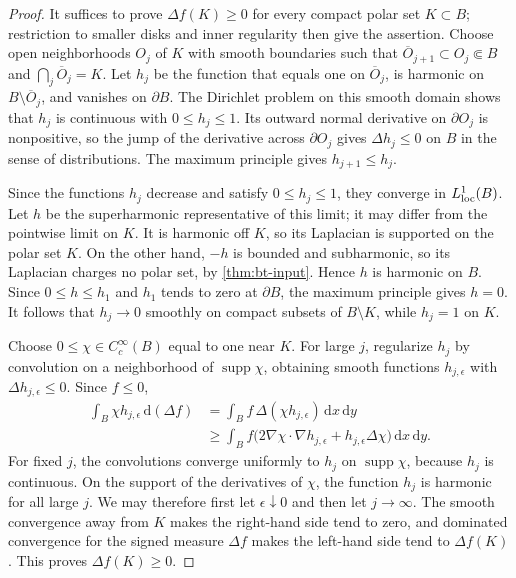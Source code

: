 \begin{proof}
It suffices to prove $\Delta f(K)\geq0$ for every compact polar set $K\subset B$; restriction to smaller disks and inner regularity then give the assertion. Choose open neighborhoods $O_j$ of $K$ with smooth boundaries such that $\overline O_{j+1}\subset O_j\Subset B$ and $\bigcap_j\overline O_j=K$. Let $h_j$ be the function that equals one on $\overline O_j$, is harmonic on $B\setminus\overline O_j$, and vanishes on $\partial B$. The Dirichlet problem on this smooth domain shows that $h_j$ is continuous with $0\leq h_j\leq1$. Its outward normal derivative on $\partial O_j$ is nonpositive, so the jump of the derivative across $\partial O_j$ gives $\Delta h_j\leq0$ on $B$ in the sense of distributions. The maximum principle gives $h_{j+1}\leq h_j$.

Since the functions $h_j$ decrease and satisfy $0\leq h_j\leq1$, they converge in $L^1_{\mathrm{loc}}(B)$. Let $h$ be the superharmonic representative of this limit; it may differ from the pointwise limit on $K$. It is harmonic off $K$, so its Laplacian is supported on the polar set $K$. On the other hand, $-h$ is bounded and subharmonic, so its Laplacian charges no polar set, by \cref{thm:bt-input}. Hence $h$ is harmonic on $B$. Since $0\leq h\leq h_1$ and $h_1$ tends to zero at $\partial B$, the maximum principle gives $h=0$. It follows that $h_j\to0$ smoothly on compact subsets of $B\setminus K$, while $h_j=1$ on $K$.

Choose $0\leq\chi\in C_c^\infty(B)$ equal to one near $K$. For large $j$, regularize $h_j$ by convolution on a neighborhood of $\operatorname{supp}\chi$, obtaining smooth functions $h_{j,\epsilon}$ with $\Delta h_{j,\epsilon}\leq0$. Since $f\leq0$,
\[
 \begin{split}
 \int_B\chi h_{j,\epsilon}\,\mathrm{d}(\Delta f)
 &=\int_B f\,\Delta(\chi h_{j,\epsilon})\,\mathrm{d}x\,\mathrm{d}y\\
 &\geq\int_B f\bigl(2\nabla\chi\cdot\nabla h_{j,\epsilon}
                  +h_{j,\epsilon}\Delta\chi\bigr)\,\mathrm{d}x\,\mathrm{d}y.
 \end{split}
\]
For fixed $j$, the convolutions converge uniformly to $h_j$ on $\operatorname{supp}\chi$, because $h_j$ is continuous. On the support of the derivatives of $\chi$, the function $h_j$ is harmonic for all large $j$. We may therefore first let $\epsilon\downarrow0$ and then let $j\to\infty$. The smooth convergence away from $K$ makes the right-hand side tend to zero, and dominated convergence for the signed measure $\Delta f$ makes the left-hand side tend to $\Delta f(K)$. This proves $\Delta f(K)\geq0$.
\end{proof}

